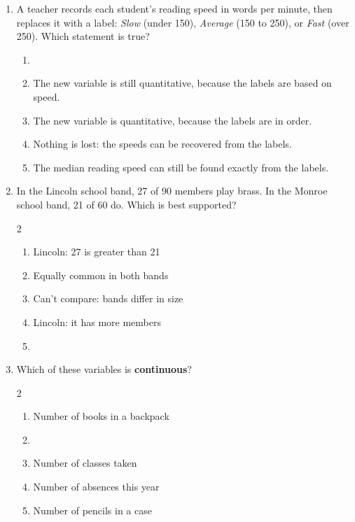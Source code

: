 \documentclass[12pt]{article}
\newenvironment{choices}
  {\begin{enumerate}[label=\textbf{(\Alph*)}, leftmargin=2.2em, itemsep=0pt, topsep=1pt]}
  {\end{enumerate}}
\newcommand{\letterroom}{\rule[-15pt]{0pt}{36pt}}
\begin{document}
\begin{enumerate}[leftmargin=1.9em, itemsep=0.03in]

  \boxguard[10]
  \item A teacher records each student's reading speed in words per minute, then replaces it
        with a label: \emph{Slow} (under 150), \emph{Average} (150 to 250), or \emph{Fast} (over
        250). Which statement is true?
        \begin{choices}
          \item {}
          \item The new variable is still quantitative, because the labels are based on speed.
          \item The new variable is quantitative, because the labels are in order.
          \item Nothing is lost: the speeds can be recovered from the labels.
          \item The median reading speed can still be found exactly from the labels.
                \hfill{}\letterroom
        \end{choices}

  \boxguard[10]
  \item In the Lincoln school band, 27 of 90 members play brass. In the Monroe school band, 21 of
        60 do. Which is best supported?\hfill{}\letterroom
        \begin{multicols}{2}
        \begin{choices}
          \item Lincoln: 27 is greater than 21
          \item Equally common in both bands
          \item Can't compare: bands differ in size
          \item Lincoln: it has more members
          \item {}
        \end{choices}
        \end{multicols}

  \boxguard[8]
  \item Which of these variables is \textbf{continuous}?\hfill{}\letterroom
        \begin{multicols}{2}
        \begin{choices}
          \item Number of books in a backpack
          \item {}
          \item Number of classes taken
          \item Number of absences this year
          \item Number of pencils in a case
        \end{choices}
        \end{multicols}


\end{enumerate}
\end{document}
